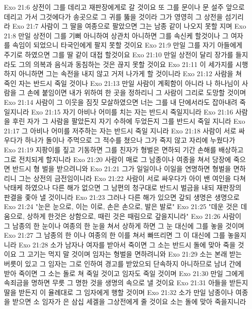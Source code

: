 Exo 21:6  상전이 그를 데리고 재판장에게로 갈 것이요 또 그를 문이나 문 설주 앞으로 데리고 가서 그것에다가 송곳으로 그 귀를 뚫을 것이라 그가 영영히 그 상전을 섬기리라
Exo 21:7  사람이 그 딸을 여종으로 팔았으면 그는 남종 같이 나오지 못할 지며
Exo 21:8  만일 상전이 그를 기뻐 아니하여 상관치 아니하면 그를 속신케 할것이나 그 여자를 속임이 되었으니 타국인에게 팔지 못할 것이요
Exo 21:9  만일 그를 자기 아들에게 주기로 하였으면 그를 딸 같이 대접 할것이요
Exo 21:10  만일 상전이 달리 장가를 들지라도 그의 의복과 음식과 동침하는 것은 끊지 못할 것이요
Exo 21:11  이 세가지를 시행하지 아니하면 그는 속전을 내지 않고 거저 나가게 할 것이니라
Exo 21:12  사람을 쳐 죽인 자는 반드시 죽일 것이나
Exo 21:13  만일 사람이 계획함이 아니라 나 하나님이 사람을 그 손에 붙임이면 내가 위하여 한 곳을 정하리니 그 사람이 그리로 도망할 것이며
Exo 21:14  사람이 그 이웃을 짐짓 모살하였으면 너는 그를 내 단에서라도 잡아내려 죽일지니라
Exo 21:15  자기 아비나 어미를 치는 자는 반드시 죽일지니라
Exo 21:16  사람을 후린 자가 그 사람을 팔았든지 자기 수하에 두었든지 그를 반드시 죽일 지니라
Exo 21:17  그 아비나 어미를 저주하는 자는 반드시 죽일 지니라
Exo 21:18  사람이 서로 싸우다가 하나가 돌이나 주먹으로 그 적수를 쳤으나 그가 죽지 않고 자리에 누웠다가
Exo 21:19  지팡이를 짚고 기동하면 그를 친자가 형벌은 면하되 기간 손해를 배상하고 그로 전치되게 할지니라
Exo 21:20  사람이 매로 그 남종이나 여종을 쳐서 당장에 죽으면 반드시 형 벌을 받으려니와
Exo 21:21  그가 일일이나 이일을 연명하면 형벌을 면하리니 그는 상전의 금전임이니라
Exo 21:22  사람이 서로 싸우다가 아이 밴 여인을 다쳐 낙태케 하였으나 다른 해가 없으면 그 남편의 청구대로 반드시 벌금을 내되 재판장의 판결을 좇아 낼 것이니라
Exo 21:23  그러나 다른 해가 있으면 갚되 생명은 생명으로
Exo 21:24  "눈은 눈으로, 이는 이로, 손은 손으로, 발은 발로"
Exo 21:25  "데운 것은 데움으로, 상하게 한것은 상함으로, 때린 것은 때림으로 갚을지니라"
Exo 21:26  사람이 그 남종의 한 눈이나 여종의 한 눈을 쳐서 상하게 하면 그 눈 대신에 그를 놓을 것이며
Exo 21:27  그 남종의 한 이나 여종의 한 이를 쳐서 빠뜨리면 그 이 대신에 그를 놓을지니라
Exo 21:28  소가 남자나 여자를 받아서 죽이면 그 소는 반드시 돌에 맞아 죽을 것이요 그 고기는 먹지 말 것이며 임자는 형벌을 면하려니와
Exo 21:29  소는 본래 받는 버릇이 있고 그 임자는 그로 인하여 경고를 받았으되 단속하지 아니하므로 남녀 간에 받아 죽이면 그 소는 돌로 쳐 죽일 것이고 임자도 죽일 것이며
Exo 21:30  만일 그에게 속죄금을 명하면 무릇 그 명한 것을 생명의 속으로 낼 것이요
Exo 21:31  아들을 받든지 딸을 받든지 이 율례대로 그 임자에게 행할 것이며
Exo 21:32  소가 만일 남종이나 여종을 받으면 소 임자가 은 삼십 세겔을 그상전에게 줄 것이요 소는 돌에 맞아 죽을지니라
